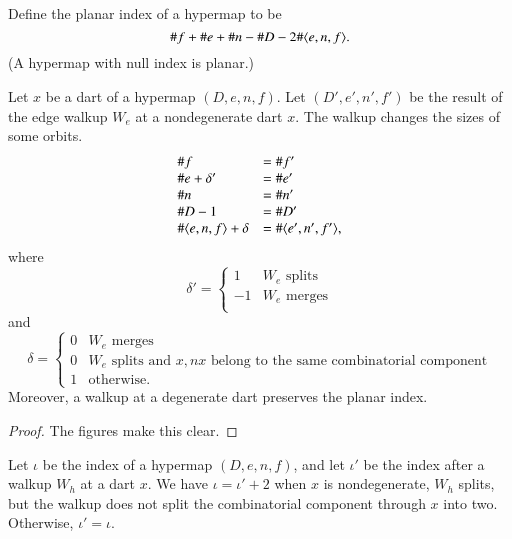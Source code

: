 \begin{definition} Define the planar index of a hypermap to be
$$\# f + \# e + \# n - \# D - 2\# \langle e,n,f\rangle.$$
(A hypermap with null index is planar.)
\end{definition}

\begin{lemma} Let $x$ be a dart of a hypermap $(D,e,n,f)$. Let $(D',e',n',f')$ be the result of the edge walkup $W_e$ at
a nondegenerate dart $x$.  
The walkup changes the sizes of some orbits.
    $$
    \begin{array}{lll}
    \# f &= \# f'\\  
    \# e + \delta' &= \# e'\\
    \# n &= \# n'\\
    \# D - 1&= \# D' \\
    \# \langle e,n,f\rangle + \delta&= \#\langle e',n',f'\rangle,\\
    \end{array}
    $$
where
   $$
   \delta' = \begin{cases}
     1 & W_e \text{ splits }\\
    -1 & W_e \text{ merges}\\
   \end{cases}
   $$
and
   $$
   \delta = \begin{cases}
    0 & W_e \text{ merges }\\
    0 & W_e \text{ splits and } x,nx 
      \text{ belong to the same combinatorial component}\\
    1 & \text{otherwise}.
     \end{cases}
   $$
Moreover, a walkup at a degenerate dart preserves the planar index.
\end{lemma}

\begin{proof} The figures make this clear.
\end{proof}

\begin{lemma}
Let $\iota$ be the index of a  hypermap $(D,e,n,f)$, and
let $\iota'$ be the index after a walkup $W_h$
at a dart $x$.  We have $\iota = \iota' + 2$ when
$x$ is nondegenerate, $W_h$ splits, but the walkup does not
split the combinatorial component through $x$ into two.
Otherwise, $\iota'=\iota$.
\end{lemma} 


